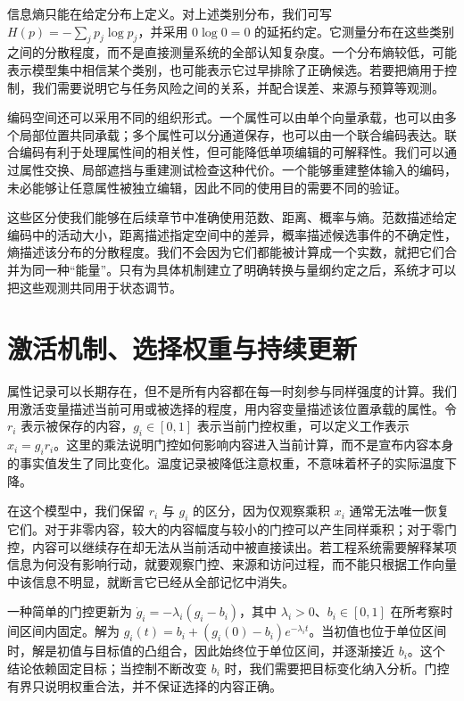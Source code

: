 信息熵只能在给定分布上定义。对上述类别分布，我们可写 $H(p)=-\sum_jp_j\log p_j$，并采用 $0\log0=0$ 的延拓约定。它测量分布在这些类别之间的分散程度，而不是直接测量系统的全部认知复杂度。一个分布熵较低，可能表示模型集中相信某个类别，也可能表示它过早排除了正确候选。若要把熵用于控制，我们需要说明它与任务风险之间的关系，并配合误差、来源与预算等观测。

编码空间还可以采用不同的组织形式。一个属性可以由单个向量承载，也可以由多个局部位置共同承载；多个属性可以分通道保存，也可以由一个联合编码表达。联合编码有利于处理属性间的相关性，但可能降低单项编辑的可解释性。我们可以通过属性交换、局部遮挡与重建测试检查这种代价。一个能够重建整体输入的编码，未必能够让任意属性被独立编辑，因此不同的使用目的需要不同的验证。

这些区分使我们能够在后续章节中准确使用范数、距离、概率与熵。范数描述给定编码中的活动大小，距离描述指定空间中的差异，概率描述候选事件的不确定性，熵描述该分布的分散程度。我们不会因为它们都能被计算成一个实数，就把它们合并为同一种“能量”。只有为具体机制建立了明确转换与量纲约定之后，系统才可以把这些观测共同用于状态调节。

\section{激活机制、选择权重与持续更新}
\label{sec:activation_field}

属性记录可以长期存在，但不是所有内容都在每一时刻参与同样强度的计算。我们用激活变量描述当前可用或被选择的程度，用内容变量描述该位置承载的属性。令 $r_i$ 表示被保存的内容，$g_i\in[0,1]$ 表示当前门控权重，可以定义工作表示 $x_i=g_i r_i$。这里的乘法说明门控如何影响内容进入当前计算，而不是宣布内容本身的事实值发生了同比变化。温度记录被降低注意权重，不意味着杯子的实际温度下降。

在这个模型中，我们保留 $r_i$ 与 $g_i$ 的区分，因为仅观察乘积 $x_i$ 通常无法唯一恢复它们。对于非零内容，较大的内容幅度与较小的门控可以产生同样乘积；对于零门控，内容可以继续存在却无法从当前活动中被直接读出。若工程系统需要解释某项信息为何没有影响行动，就要观察门控、来源和访问过程，而不能只根据工作向量中该信息不明显，就断言它已经从全部记忆中消失。

一种简单的门控更新为 $\dot g_i=-\lambda_i(g_i-b_i)$，其中 $\lambda_i>0$、$b_i\in[0,1]$ 在所考察时间区间内固定。解为 $g_i(t)=b_i+(g_i(0)-b_i)e^{-\lambda_it}$。当初值也位于单位区间时，解是初值与目标值的凸组合，因此始终位于单位区间，并逐渐接近 $b_i$。这个结论依赖固定目标；当控制不断改变 $b_i$ 时，我们需要把目标变化纳入分析。门控有界只说明权重合法，并不保证选择的内容正确。

